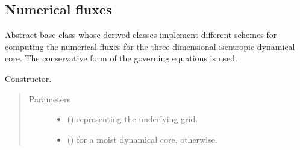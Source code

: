 \documentclass[letterpaper,10pt,english]{sphinxmanual}
\begin{document}
\subsection{Numerical fluxes}
\label{\detokenize{api:numerical-fluxes}}

\begin{fulllineitems}
\label{\detokenize{api:dycore.flux_isentropic.FluxIsentropic}}
Abstract base class whose derived classes implement different schemes for computing the numerical fluxes for
the three-dimensional isentropic dynamical core. The conservative form of the governing equations is used.

\begin{fulllineitems}
\label{\detokenize{api:dycore.flux_isentropic.FluxIsentropic.__init__}}
Constructor.
\begin{quote}\begin{description}
\item[{Parameters}] \leavevmode\begin{itemize}
\item {} 
 () \textendash{} {\hyperref[\detokenize{api:grids.grid_xyz.GridXYZ}]{}} representing the underlying grid.

\item {} 
 () \textendash{}  for a moist dynamical core,  otherwise.

\end{itemize}

\end{description}\end{quote}

\end{fulllineitems}



\end{fulllineitems}
\end{document}
